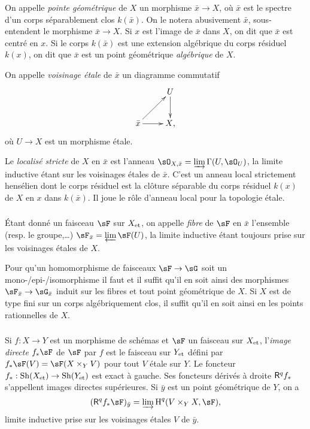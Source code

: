 On appelle \emph{pointe géométrique} de $X$ un morphisme $\bar x\to X$, où 
$\bar x$ est le spectre d'un corps séparablement clos $k(\bar x)$. On le notera 
abusivement $\bar x$, sous-entendent le morphisme $\bar x\to X$. Si $x$ est 
l'image de $\bar x$ dans $X$, on dit que $\bar x$ est centré en $x$. Si le 
corps $k(\bar x)$ est une extension algébrique du corps résiduel $k(x)$, on dit 
que $\bar x$ est un point géométrique \emph{algébrique} de $X$. 

On appelle \emph{voisinage étale} de $\bar x$ un diagramme commutatif 
\[\xymatrix{
  & U \ar[d] \\
  \bar x \ar[ur] \ar[r] 
  & X\text{,}
}\]
où $U\to X$ est un morphisme étale. 

Le \emph{localisé stricte} de $X$ en $\bar x$ est l'anneau 
$\sO_{X,\bar x} = \varinjlim \Gamma(U,\sO_U)$, la limite inductive étant sur les 
voisinages étales de $\bar x$. C'est un anneau local strictement hensélien dont 
le corps résiduel est la clôture séparable du corps résiduel $k(x)$ de $X$ en 
$x$ dans $k(\bar x)$. Il joue le rôle d'anneau local pour la topologie étale. 





\subsubsection{}\label{I:2-3-2}

Étant donné un faisceau $\sF$ sur ${X}_{\textnormal{et}}$, on appelle \emph{fibre} de $\sF$ en 
$\bar x$ l'ensemble (resp. le groupe,\dots) $\sF_{\bar x}=\varprojlim \sF(U)$, 
la limite inductive étant toujours prise sur les voisinages étales de  $X$. 

Pour qu'un homomorphisme de faisceaux $\sF\to \sG$ soit un 
mono-/epi-/isomorphisme il faut et il suffit qu'il en soit ainsi des morphismes 
$\sF_{\bar x}\to \sG_{\bar x}$ induit sur les fibres et tout point géométrique 
de $X$. Si $X$ est de type fini sur un corps algébriquement clos, il suffit 
qu'il en soit ainsi en les points rationnelles de $X$. 





\subsubsection{}\label{I:2-3-3}

Si $f:X\to Y$ est un morphisme de schémas et $\sF$ un faisceau sur ${X}_{\textnormal{et}}$, 
l'\emph{image directe} $f_* \sF$ de $\sF$ par $f$ est le faisceau sur ${Y}_{\textnormal{et}}$ 
défini par $f_* \sF(V) = \sF(X\times_Y V)$ pour tout $V$ étale sur $Y$. Le foncteur 
$f_*:\operatorname{Sh}({X}_{\textnormal{et}})\to \operatorname{Sh}({Y}_{\textnormal{et}})$ est exact à gauche. Ses foncteurs 
dérivés à droite $\mathsf{R}^q f_*$ s'appellent images directes supérieures. Si 
$\bar y$ est un point géométrique de $Y$, on a 
\[
  (\R^q f_* \sF)_{\bar y} = \varinjlim \h^q(V\times_Y X,\sF)\text{,}
\]
limite inductive prise sur les voisinages étales $V$ de $\bar y$. 

